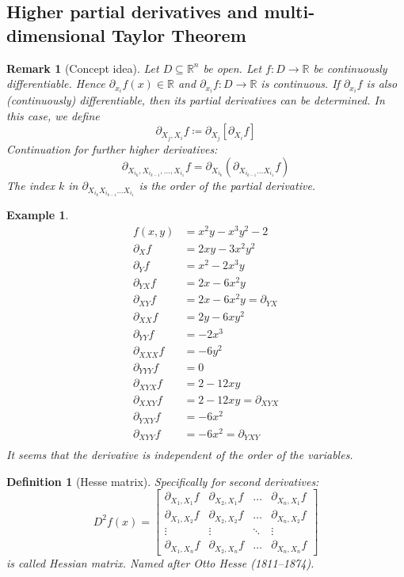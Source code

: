 \documentclass{article}
\newtheorem{example}{Example}  \numberwithin{example}{section}
\newtheorem{definition}{Definition}  \numberwithin{definition}{section}
\newtheorem{remark}{Remark}  \numberwithin{remark}{section}
\begin{document}
\subsection{Higher partial derivatives and multi-dimensional Taylor Theorem}

\begin{remark}[Concept idea]
  Let $D \subseteq \mathbb R^n$ be open. Let $f: D \to \mathbb  R$ be continuously differentiable.
  Hence $\partial_{x_i} f(x) \in \mathbb R$ and $\partial_{x_i} f: D \to \mathbb R$ is continuous.
  If $\partial_{x_i} f$ is also (continuously) differentiable, then its partial derivatives can be determined.
  In this case, we define
  \[ \partial_{X_j, X_i} f \coloneqq \partial_{X_j} [\partial_{X_i} f] \]
  Continuation for further higher derivatives:
  \[ \partial_{X_{i_k}, X_{i_{k-1}}, \dots, X_{i_1}} f = \partial_{X_{i_k}} (\partial_{X_{i_{k-1}} \dots X_{i_1}} f) \]
  The index $k$ in $\partial_{X_{i_k} X_{i_{k-1}} \dots X_{i_1}}$ is the \emph{order of the partial derivative}.
\end{remark}

\begin{example}
  \begin{align*}
    f(x, y) &= x^2 y - x^3 y^2 - 2 \\
    \partial_X f &= 2xy - 3x^2 y^2 \\
    \partial_Y f &= x^2 - 2x^3 y \\
    \partial_{YX} f &= 2x - 6x^2y \\
    \partial_{XY} f &= 2x - 6x^2y = \partial_{YX} \\
    \partial_{XX} f &= 2y - 6xy^2 \\
    \partial_{YY} f &= -2x^3 \\
    \partial_{XXX} f &= -6y^2 \\
    \partial_{YYY} f &= 0 \\
    \partial_{XYX} f &= 2 - 12xy \\
    \partial_{XXY} f &= 2 - 12xy = \partial_{XYX} \\
    \partial_{YXY} f &= -6x^2 \\
    \partial_{XYY} f &= -6x^2 = \partial_{YXY} \\
  \end{align*}
  It seems that the derivative is independent of the order of the variables.
\end{example}

\begin{definition}[Hesse matrix]
  Specifically for second derivatives:
  \[
    D^2 f(x) = \begin{bmatrix}
      \partial_{X_1,X_1} f & \partial_{X_2,X_1} f & \dots & \partial_{X_n,X_1} f \\
      \partial_{X_1,X_2} f & \partial_{X_2,X_2} f & \dots & \partial_{X_n,X_2} f \\
      \vdots & \vdots & \ddots & \vdots \\
      \partial_{X_1,X_n} f & \partial_{X_2,X_n} f & \dots & \partial_{X_n,X_n} f
    \end{bmatrix}
  \]
  is called \emph{Hessian matrix}. Named after Otto Hesse (1811--1874).
\end{definition}
\end{document}
